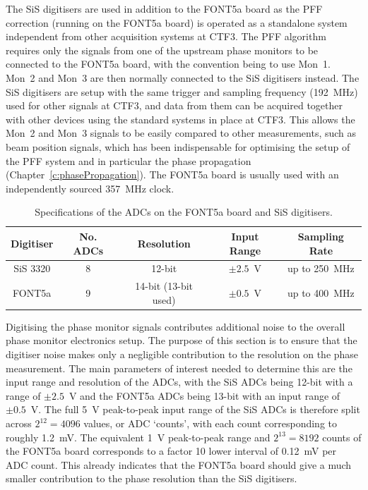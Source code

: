 The SiS digitisers are used in addition to the FONT5a board as the PFF correction (running on the FONT5a board) is operated as a standalone system independent from other acquisition systems at CTF3. The PFF algorithm requires only the signals from one of the upstream phase monitors to be connected to the FONT5a board, with the convention being to use Mon~1. Mon~2 and Mon~3 are then normally connected to the SiS digitisers instead. The SiS digitisers are setup with the same trigger and sampling frequency (192~MHz) used for other signals at CTF3, and data from them can be acquired together with other devices using the standard systems in place at CTF3. This allows the Mon~2 and Mon~3 signals to be easily compared to other measurements, such as beam position signals, which has been indispensable for optimising the setup of the PFF system and in particular the phase propagation (Chapter~\ref{c:phasePropagation}). The FONT5a board is usually used with an independently sourced 357~MHz clock.

\begin{table}
  \begin{center}
    \begin{tabular}{|c c c c c|}
	   \hline
       Digitiser & No. ADCs & Resolution & Input Range & Sampling Rate  \\ \hline
       SiS 3320 & 8 & 12-bit & \(\pm2.5\)~V & up to 250~MHz \\
       FONT5a & 9 & 14-bit (13-bit used) & \(\pm0.5\)~V & up to 400~MHz \\ \hline
    \end{tabular}
    \caption{Specifications of the ADCs on the FONT5a board and SiS digitisers.}
  	\label{t:adcSpecs}
  \end{center}
\end{table}

Digitising the phase monitor signals contributes additional noise to the overall phase monitor electronics setup. The purpose of this section is to ensure that the digitiser noise makes only a negligible contribution to the resolution on the phase measurement. The main parameters of interest needed to determine this are the input range and resolution of the ADCs, with the SiS ADCs being 12-bit with a range of \(\pm2.5\)~V and the FONT5a ADCs being 13-bit with an input range of \(\pm0.5\)~V. The full 5~V peak-to-peak input range of the SiS ADCs is therefore split across \(2^{12}=4096\) values, or ADC `counts', with each count corresponding to roughly 1.2~mV. The equivalent 1~V peak-to-peak range and \(2^{13}=8192\) counts of the FONT5a board corresponds to a factor 10 lower interval of 0.12~mV per ADC count. This already indicates that the FONT5a board should give a much smaller contribution to the phase resolution than the SiS digitisers.

